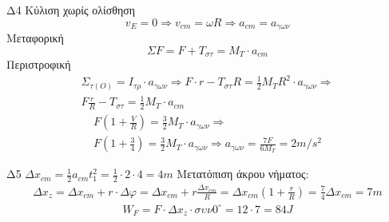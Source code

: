 \documentclass[greek]{beamer}
\begin{document}
\begin{frame}{Δ4}
Κύλιση χωρίς ολίσθηση
$$v_E=0\Rightarrow v_{cm}=ωR\Rightarrow a_{cm}=a_{γων}$$
Μεταφορική
$$ΣF=F+T_{στ}=M_T\cdot a_{cm}$$
Περιστροφική
\begin{gather*}
   Σ_{τ(Ο)}=I_{τρ}\cdot a_{γων} \Rightarrow F\cdot r-T_{στ}R=\frac{1}{2}M_TR^2\cdot a_{γων}\Rightarrow \\
   F\frac{r}{R}-T_{στ}=\frac{1}{2}M_T\cdot a_{cm}
\end{gather*}
\begin{gather*}
   F\left(1+\frac{V}{R}\right)=\frac{3}{2}M_T\cdot a_{γων}\Rightarrow \\
   F\left(1+\frac{3}{4}\right)=\frac{3}{2}M_T\cdot a_{γων}\Rightarrow a_{γων}=\frac{7F}{6M_T}=2m/s^2
\end{gather*}
\end{frame}

\begin{frame}{Δ5}
$Δx_{cm}=\frac{1}{2}a_{cm}t_1^2=\frac{1}{2}\cdot 2 \cdot 4=4m$
Μετατόπιση άκρου νήματος:
\begin{gather*}
   Δx_z=Δx_{cm}+r\cdot Δφ=Δx_{cm}+r\frac{Δx_{cm}}{R}=Δx_{cm}\left(1+\frac{r}{R}\right)=\frac{7}{4}Δx_{cm}=7m
\end{gather*}
\begin{gather*}
   W_F=F\cdot Δx_z\cdot συν0^\circ=12\cdot 7=84J
\end{gather*}
\end{frame}
\end{document}
